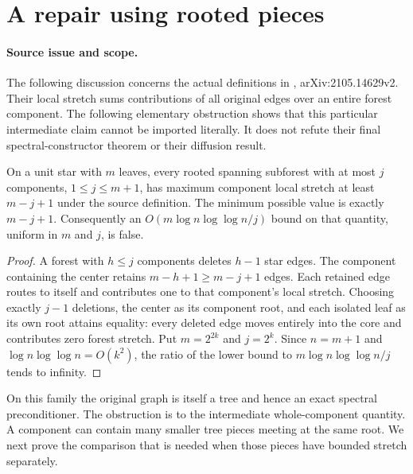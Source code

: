 \section[Rooted-piece spectral comparison]{A repair using rooted pieces}
\label{sec:op3-rooted-piece-comparison}

\paragraph{Source issue and scope.}
The following discussion concerns the actual definitions in
\citet[Definitions 5.4/5.7 and Lemma 5.9, PDF pp.\ 22--23]{chen2021diffusion},
arXiv:2105.14629v2. Their local stretch sums contributions of all
original edges over an entire forest component. The following elementary
obstruction shows that this particular intermediate claim cannot be
imported literally. It does not refute their final spectral-constructor
theorem or their diffusion result.

\begin{proposition}
\label{prop:op3-component-stretch-star}
On a unit star with $m$ leaves, every rooted spanning subforest with
at most $j$ components, $1\leq j\leq m+1$, has maximum component local
stretch at least $m-j+1$ under the source definition. The minimum
possible value is exactly $m-j+1$.
Consequently an $O(m\log n\log\log n/j)$ bound on that quantity,
uniform in $m$ and $j$, is false.
\end{proposition}
\begin{proof}
A forest with $h\leq j$ components deletes $h-1$ star edges. The
component containing the center retains $m-h+1\geq m-j+1$ edges.
Each retained edge routes to itself and contributes one to that
component's local stretch. Choosing exactly $j-1$ deletions, the center
as its component root, and each isolated leaf as its own root attains
equality: every deleted edge moves entirely into the core and contributes
zero forest stretch. Put $m=2^{2k}$ and $j=2^k$. Since $n=m+1$ and
$\log n\log\log n=O(k^2)$, the ratio of the lower bound to
$m\log n\log\log n/j$ tends to infinity.
\end{proof}

On this family the original graph is itself a tree and hence an exact
spectral preconditioner. The obstruction is to the intermediate
whole-component quantity. A component can contain many smaller tree
pieces meeting at the same root. We next prove the comparison that is
needed when those pieces have bounded stretch separately.

